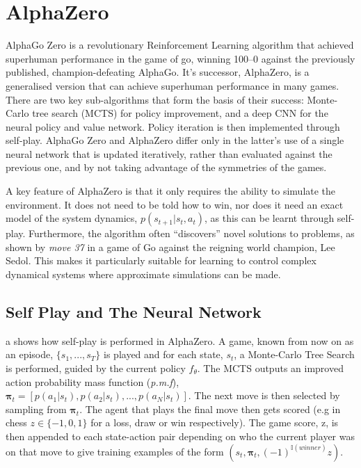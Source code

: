 \documentclass[../main.tex]{subfiles}
\begin{document}
\section{AlphaZero}
AlphaGo Zero is a revolutionary Reinforcement Learning algorithm that achieved superhuman performance in the game of go, winning 100–0 against the previously published, champion-defeating AlphaGo. It's successor, AlphaZero, is a generalised version that can achieve superhuman performance in many games. There are two key sub-algorithms that form the basis of their success: Monte-Carlo tree search (MCTS) for policy improvement, and a deep CNN for the neural policy and value network. Policy iteration is then implemented through self-play. AlphaGo Zero and AlphaZero differ only in the latter's use of a single neural network that is updated iteratively, rather than evaluated against the previous one, and by not taking advantage of the symmetries of the games.

A key feature of AlphaZero is that it only requires the ability to simulate the environment. It does not need to be told how to win, nor does it need an exact model of the system dynamics, $p(s_{t+1} |s_t, a_t)$, as this can be learnt through self-play. Furthermore, the algorithm often ``discovers'' novel solutions to problems, as shown by \textit{move 37} in a game of Go against the reigning world champion, Lee Sedol. This makes it particularly suitable for learning to control complex dynamical systems where approximate simulations can be made.

\subsection{Self Play and The Neural Network}
a
shows how self-play is performed in AlphaZero. A game, known from now on as an episode, $\{s_1, ..., s_T\}$ is played and for each state, $s_t$, a Monte-Carlo Tree Search is performed, guided by the current policy $f_\theta$. The MCTS outputs an improved action probability mass function (\textit{p.m.f}), $\boldsymbol{\pi}_t = [p(a_1|s_t), p(a_2|s_t), ..., p(a_N|s_t)]$. The next move is then selected by sampling from $\boldsymbol{\pi}_t$. The agent that plays the final move then gets scored (e.g in chess $z \in \{-1, 0, 1\} $ for a loss, draw or win respectively). The game score, z, is then appended to each state-action pair depending on who the current player was on that move to give training examples of the form $(s_t, \boldsymbol{\pi}_t, (-1)^{\mathbb{I}(winner)}z)$. 
\end{document}
